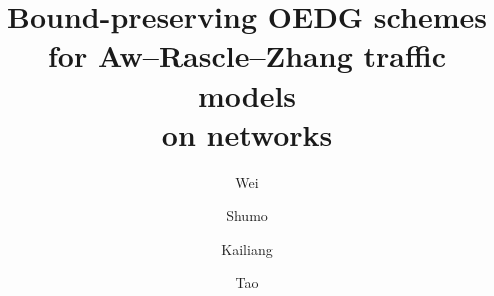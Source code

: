 \documentclass[times,final]{elsarticle}
\numberwithin{equation}{section}
\theoremstyle{definition}
\theoremstyle{remark}
\begin{document}

\begin{frontmatter}
	
	\title {
		Bound-preserving OEDG schemes for Aw--Rascle--Zhang traffic models \\ on networks 
	}
	
	
	\author[XU]{Wei }
	
	\author[ICM,SUSTech]{Shumo }
	
	\author[SUSTech,ICM,NCAMS]{Kailiang }
	
	\author[USTC]{Tao }
	
	\address[XU]{School of Mathematical Sciences, Xiamen University, Xiamen, Fujian 361005, China.}
	\address[SUSTech]{Department of Mathematics, Southern University of Science and Technology, Shenzhen 518055, China.}
	\address[ICM]{Shenzhen International Center for Mathematics, Southern University of Science and Technology, Shenzhen 518055, China.}
	\address[NCAMS]{National Center for Applied Mathematics Shenzhen (NCAMS), Shenzhen 518055, China.}
	\address[USTC]{School of Mathematical Sciences, University of Science and Technology of China, Hefei, Anhui 230026, China.}
	
	
	

\end{frontmatter}
\end{document}
